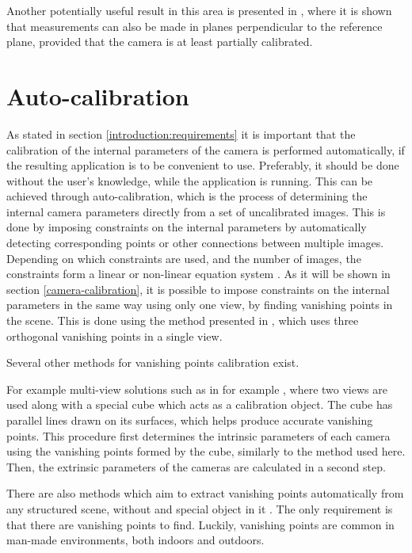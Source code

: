 Another potentially useful result in this area is presented in \cite{huang2004new}, where it is shown that measurements can also be made in planes perpendicular to the reference plane, provided that the camera is at least partially calibrated.

\section{Auto-calibration} \label{related_work:vanishing_point_calibration} 
As stated in section \ref{introduction:requirements} it is important that the calibration of the internal parameters of the camera is performed automatically, if the resulting application is to be convenient to use.
Preferably, it should be done without the user's knowledge, while the application is running.
This can be achieved through auto-calibration, which is the process of determining the internal camera parameters directly from a set of uncalibrated images.
This is done by imposing constraints on the internal parameters by automatically detecting corresponding points or other connections between multiple images. 
Depending on which constraints are used, and the number of images, the constraints form a linear or non-linear equation system \cite[p. 458-469]{hartley-zisserman}. 
As it will be shown in section \ref{camera-calibration}, it is possible to impose constraints on the internal parameters in the same way using only one view, by finding vanishing points in the scene.
This is done using the method presented in \cite[p. 195-226]{hartley-zisserman}, which uses three orthogonal vanishing points in a single view.

Several other methods for vanishing points calibration exist.

For example multi-view solutions such as in for example \cite{caprile1990using}, where two views are used along with a special cube which acts as a calibration object.
The cube has parallel lines drawn on its surfaces, which helps produce accurate vanishing points.
This procedure first determines the intrinsic parameters of each camera using the vanishing points formed by the cube, similarly to the method used here.
Then, the extrinsic parameters of the cameras are calculated in a second step.

There are also methods which aim to extract vanishing points automatically from any structured scene, without and special object in it \cite{cipolla1999camera} \cite{grammatikopoulos2007automatic}.
The only requirement is that there are vanishing points to find.
Luckily, vanishing points are common in man-made environments, both indoors and outdoors.

